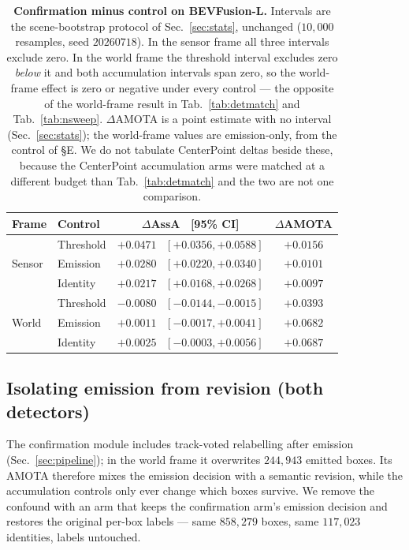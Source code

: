 \begin{table}[t]
\centering\footnotesize
\setlength{\tabcolsep}{7pt}
\begin{tabular}{llcc}
\toprule
Frame & Control & $\Delta$AssA \ [95\% CI] & $\Delta$AMOTA \\
\midrule
\multirow{3}{*}{Sensor}
 & Threshold & $+0.0471$ \ $[{+}0.0356,{+}0.0588]$ & $+0.0156$ \\
 & Emission  & $+0.0280$ \ $[{+}0.0220,{+}0.0340]$ & $+0.0101$ \\
 & Identity  & $+0.0217$ \ $[{+}0.0168,{+}0.0268]$ & $+0.0097$ \\
\midrule
\multirow{3}{*}{World}
 & Threshold & $-0.0080$ \ $[{-}0.0144,{-}0.0015]$ & $+0.0393$ \\
 & Emission  & $+0.0011$ \ $[{-}0.0017,{+}0.0041]$ & $+0.0682$ \\
 & Identity  & $+0.0025$ \ $[{-}0.0003,{+}0.0056]$ & $+0.0687$ \\
\bottomrule
\end{tabular}
\caption{\textbf{Confirmation minus control on BEVFusion-L.} Intervals are the
scene-bootstrap protocol of Sec.~\ref{sec:stats}, unchanged
($10{,}000$ resamples, seed $20260718$). In the sensor frame all three
intervals exclude zero. In the world frame the threshold interval excludes
zero \emph{below} it and both accumulation intervals span zero, so the
world-frame effect is zero or negative under every control --- the opposite of
the world-frame result in Tab.~\ref{tab:detmatch} and Tab.~\ref{tab:nsweep}.
$\Delta$AMOTA is a point estimate with no interval (Sec.~\ref{sec:stats}); the
world-frame values are emission-only, from the control of \S E. We do not
tabulate CenterPoint deltas beside these, because the CenterPoint
accumulation arms were matched at a different budget than
Tab.~\ref{tab:detmatch} and the two are not one comparison.}
\label{tab:bevtransfer}
\end{table}

\subsection*{Isolating emission from revision (both detectors)}
The confirmation module includes track-voted relabelling after emission
(Sec.~\ref{sec:pipeline}); in the world frame it overwrites $244{,}943$
emitted boxes. Its AMOTA therefore mixes the emission
decision with a semantic revision, while the accumulation controls only ever
change which boxes survive. We remove the confound with an arm that keeps the
confirmation arm's emission decision and restores the original per-box labels
--- same $858{,}279$ boxes, same $117{,}023$ identities, labels untouched.

